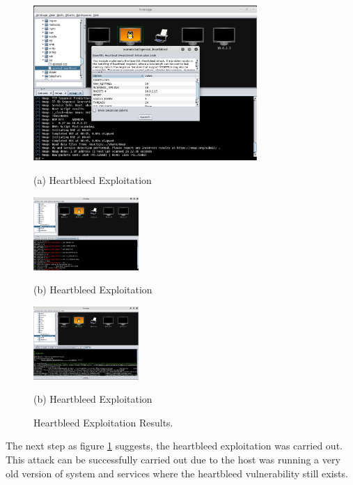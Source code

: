 \documentclass{article}
\begin{document}
\begin{figure}[H]
  \begin{minipage}[b]{1.0\linewidth}
    \centering
    \centerline{\includegraphics[width=8.5cm]{kali4}}
    \centerline{(a) Heartbleed Exploitation}\medskip
  \end{minipage}

  \begin{minipage}[b]{.48\linewidth}
    \centering
    \centerline{\includegraphics[width=4.0cm]{kali5}}
    \centerline{(b) Heartbleed Exploitation}\medskip
  \end{minipage}
  \hfill
  \begin{minipage}[b]{0.48\linewidth}
    \centering
    \centerline{\includegraphics[width=4.0cm]{kali6}}
    \centerline{(b) Heartbleed Exploitation}\medskip
  \end{minipage}
  \caption{Heartbleed Exploitation Results.}
  \label{kali4-5-6}
  \end{figure}

The next step as figure \ref{kali4-5-6} suggests, the heartbleed exploitation was carried out. This attack 
can be successfully carried out due to the host was running a very old version of system and services where 
the heartbleed vulnerability still exists.
\end{document}
